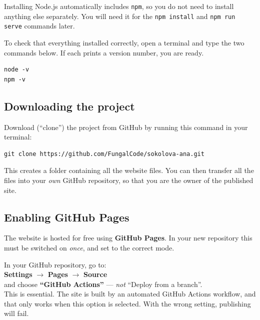 \documentclass[11pt,a4paper]{article}
\newcommand{\cmd}[1]{\texttt{#1}}
\begin{document}
\noindent Installing Node.js automatically includes \cmd{npm}, so you do
not need to install anything else separately. You will need it for the
\cmd{npm install} and \cmd{npm run serve} commands later.

\begin{tipbox}
To check that everything installed correctly, open a terminal and type
the two commands below. If each prints a version number, you are ready.
\begin{lstlisting}[style=shell]
node -v
npm -v
\end{lstlisting}
\end{tipbox}

\subsection{Downloading the project}

Download (``clone'') the project from GitHub by running this command in
your terminal:

\begin{lstlisting}[style=shell]
git clone https://github.com/FungalCode/sokolova-ana.git
\end{lstlisting}

\noindent This creates a folder containing all the website files. You can
then transfer all the files into your \emph{own} GitHub repository, so
that you are the owner of the published site.

\subsection{Enabling GitHub Pages}\label{sec:pages}

The website is hosted for free using \textbf{GitHub Pages}. In your new
repository this must be switched on \emph{once}, and set to the correct
mode.

\begin{importantbox}
In your GitHub repository, go to:\\[4pt]
\textbf{Settings} $\rightarrow$ \textbf{Pages} $\rightarrow$
\textbf{Source}\\[4pt]
and choose \textbf{``GitHub Actions''} — \emph{not} ``Deploy from a
branch''.\\[6pt]
This is essential. The site is built by an automated GitHub Actions
workflow, and that only works when this option is selected. With the
wrong setting, publishing will fail.
\end{importantbox}
\end{document}
